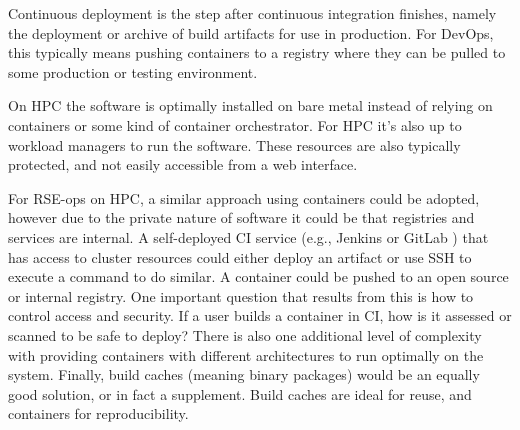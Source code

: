 Continuous deployment is the step after continuous integration finishes, namely the deployment or archive of build artifacts for use in production. 
For DevOps, this typically means pushing containers to a registry where they can be pulled to some production or testing environment.

On HPC the software is optimally installed on bare metal instead of relying on containers or some kind of container orchestrator. For HPC it's also up to workload managers \cite{slurm,flux} to run the software. These resources are also typically protected, and not easily accessible from a web interface.

For RSE-ops on HPC, a similar approach using containers could be adopted, however due to the private nature of software it could be that registries and services are internal. A self-deployed CI service (e.g., Jenkins or GitLab \cite{jenkins,gitlab}) that has access to cluster resources could either deploy an artifact or use SSH to execute a command to do similar. A container could be pushed to an open source or internal registry. One important question that results from this is how to control access and security. If a user builds a container in CI, how is it assessed or scanned to be safe to deploy?  There is also one additional level of complexity with providing containers with different architectures to run
optimally on the system. Finally, build caches (meaning binary packages) would be an equally good solution, or in fact a supplement. Build caches are ideal for reuse, and containers for reproducibility.
